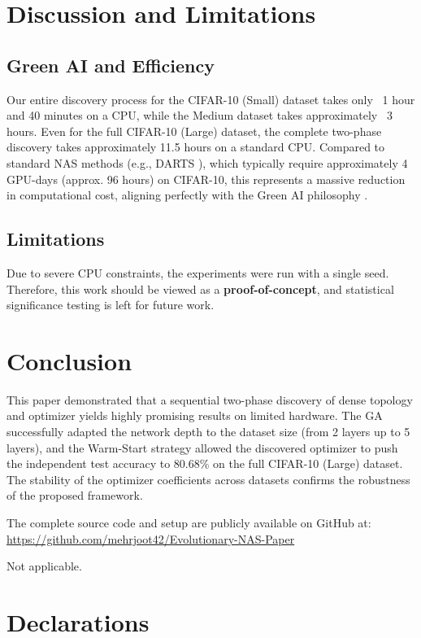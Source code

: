 \documentclass[sn-mathphys]{sn-jnl}%
\begin{document}
\section{Discussion and Limitations}\label{sec4}
\subsection{Green AI and Efficiency}
Our entire discovery process for the CIFAR-10 (Small) dataset takes only ~1 hour and 40 minutes on a CPU, while the Medium dataset takes approximately ~3 hours. Even for the full CIFAR-10 (Large) dataset, the complete two-phase discovery takes approximately 11.5 hours on a standard CPU. Compared to standard NAS methods (e.g., DARTS \cite{ref3}), which typically require approximately 4 GPU-days (approx. 96 hours) on CIFAR-10, this represents a massive reduction in computational cost, aligning perfectly with the Green AI philosophy \cite{ref5}. 

\subsection{Limitations}
Due to severe CPU constraints, the experiments were run with a single seed. Therefore, this work should be viewed as a \textbf{proof-of-concept}, and statistical significance testing is left for future work.

\section{Conclusion}\label{sec5}
This paper demonstrated that a sequential two-phase discovery of dense topology and optimizer yields highly promising results on limited hardware. The GA successfully adapted the network depth to the dataset size (from 2 layers up to 5 layers), and the Warm-Start strategy allowed the discovered optimizer to push the independent test accuracy to 80.68\% on the full CIFAR-10 (Large) dataset. The stability of the optimizer coefficients across datasets confirms the robustness of the proposed framework.

\backmatter

The complete source code and setup are publicly available on GitHub at: \url{https://github.com/mehrjoot42/Evolutionary-NAS-Paper}

Not applicable.

\section*{Declarations}
\end{document}
